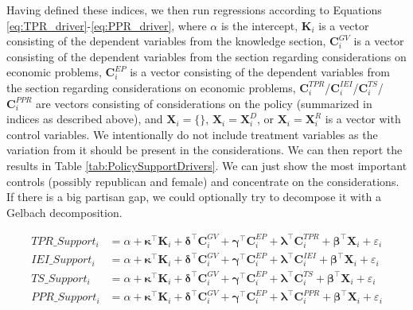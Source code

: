 \documentclass[11pt]{article}
\begin{document}
Having defined these indices, we then run regressions according to Equations \ref{eq:TPR_driver}-\ref{eq:PPR_driver}, where $\alpha$ is the intercept, $\mathbf{K}_i$ is a vector consisting of the dependent variables from the knowledge section, $\mathbf{C}_i^{GV}$ is a vector consisting of the dependent variables from the section regarding considerations on economic problems, $\mathbf{C}_i^{EP}$ is a vector consisting of the dependent variables from the section regarding considerations on economic problems, $\mathbf{C}_i^{TPR}$/$\mathbf{C}_i^{IEI}$/$\mathbf{C}_i^{TS}$/$\mathbf{C}_i^{PPR}$ are vectors consisting of considerations on the policy (summarized in indices as described above), and $\mathbf{X}_{i} = \{\}$, $\mathbf{X}_{i} = \mathbf{X}_{i}^{D}$, or $\mathbf{X}_{i} = \mathbf{X}_{i}^{R}$ is a vector with control variables. We intentionally do not include treatment variables as the variation from it should be present in the considerations. We can then report the results in Table \ref{tab:PolicySupportDrivers}. We can just show the most important controls (possibly republican and female) and concentrate on the considerations. If there is a big partisan gap, we could optionally try to decompose it with a Gelbach decomposition. 

\begin{align}
    \label{eq:TPR_driver}
    \text{$TPR\_Support_i$} 
    &= \alpha 
    + \boldsymbol{\kappa}^{\top}\mathbf{K}_i
    + \boldsymbol{\delta}^{\top}\mathbf{C}_i^{GV}
    + \boldsymbol{\gamma}^{\top}\mathbf{C}_i^{EP} 
    + \boldsymbol{\lambda}^{\top}\mathbf{C}_i^{TPR}
    + \boldsymbol{\beta}^{\top}\mathbf{X}_i
    + \varepsilon_i \\
    \text{$IEI\_Support_i$} 
    &= \alpha 
    + \boldsymbol{\kappa}^{\top}\mathbf{K}_i
    + \boldsymbol{\delta}^{\top}\mathbf{C}_i^{GV}
    + \boldsymbol{\gamma}^{\top}\mathbf{C}_i^{EP} 
    + \boldsymbol{\lambda}^{\top}\mathbf{C}_i^{IEI}
    + \boldsymbol{\beta}^{\top}\mathbf{X}_i
    + \varepsilon_i \\
    \text{$TS\_Support_i$} 
    &= \alpha 
    + \boldsymbol{\kappa}^{\top}\mathbf{K}_i
    + \boldsymbol{\delta}^{\top}\mathbf{C}_i^{GV}
    + \boldsymbol{\gamma}^{\top}\mathbf{C}_i^{EP} 
    + \boldsymbol{\lambda}^{\top}\mathbf{C}_i^{TS}
    + \boldsymbol{\beta}^{\top}\mathbf{X}_i
    + \varepsilon_i \\
    \label{eq:PPR_driver}
    \text{$PPR\_Support_i$} 
    &= \alpha 
    + \boldsymbol{\kappa}^{\top}\mathbf{K}_i
    + \boldsymbol{\delta}^{\top}\mathbf{C}_i^{GV}
    + \boldsymbol{\gamma}^{\top}\mathbf{C}_i^{EP} 
    + \boldsymbol{\lambda}^{\top}\mathbf{C}_i^{PPR}
    + \boldsymbol{\beta}^{\top}\mathbf{X}_i
    + \varepsilon_i
\end{align}    
\end{document}
